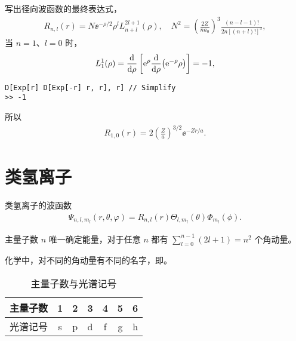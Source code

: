 写出径向波函数的最终表达式，
\begin{align}
    R_{n,l} (r) = N \ee^{-\rho/2} \rho^l L^{2l+1}_{n+l}(\rho), 
    \quad N^2 = \left(\frac{2Z}{na_0}\right)^3 \frac{(n-l-1)!}{2n[(n+l)!]^3},
\end{align}
当 $n = 1$、$l=0$ 时，
\begin{align}
    L_1^1 (\rho) = \dv{\rho} \left[
        \mathrm{e}^{\rho} \dv{\rho} (\mathrm{e}^{-\rho}\rho)
    \right] = -1,
\end{align}
\begin{lstlisting}
D[Exp[r] D[Exp[-r] r, r], r] // Simplify
>> -1
\end{lstlisting}
所以
\begin{align}
    R_{1,0} (r) = 2 \left(\frac Za\right)^{3/2} \ee^{-Zr/a}. 
\end{align}

\section{类氢离子}
类氢离子的波函数
\begin{align}
    \Psi_{n,l,m_l}(r,\theta,\varphi) = R_{n,l}(r) \Theta_{l,m_l}(\theta) \Phi_{m_l}(\phi).
\end{align}

主量子数 $n$ 唯一确定能量，对于任意 $n$ 都有 $\sum_{l=0}^{n-1} (2l+1) = n^2$ 个角动量。

化学中，对不同的角动量有不同的名字，即。
\begin{table}[ht]
    \centering
    \begin{tabular}[t]{ccccccc}
    \toprule
    主量子数 & 1&2&3&4&5&6\\
    \midrule
    光谱记号 & s&p&d&f&g&h\\
    \bottomrule
    \end{tabular}
    \caption{主量子数与光谱记号}
    \end{table}%

